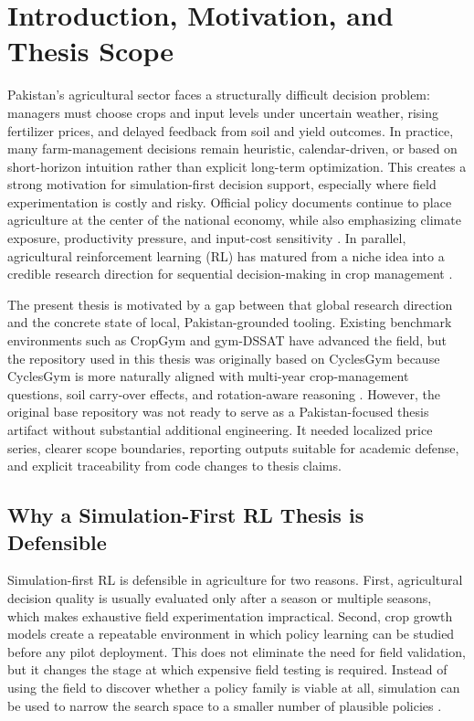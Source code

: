 \chapter{Introduction, Motivation, and Thesis Scope}

Pakistan's agricultural sector faces a structurally difficult decision problem: managers must choose crops and input levels under uncertain weather, rising fertilizer prices, and delayed feedback from soil and yield outcomes. In practice, many farm-management decisions remain heuristic, calendar-driven, or based on short-horizon intuition rather than explicit long-term optimization. This creates a strong motivation for simulation-first decision support, especially where field experimentation is costly and risky. Official policy documents continue to place agriculture at the center of the national economy, while also emphasizing climate exposure, productivity pressure, and input-cost sensitivity \citep{pakistaneconomicsurvey2025}. In parallel, agricultural reinforcement learning (RL) has matured from a niche idea into a credible research direction for sequential decision-making in crop management \citep{gautron2022review}.

The present thesis is motivated by a gap between that global research direction and the concrete state of local, Pakistan-grounded tooling. Existing benchmark environments such as CropGym and gym-DSSAT have advanced the field, but the repository used in this thesis was originally based on CyclesGym because CyclesGym is more naturally aligned with multi-year crop-management questions, soil carry-over effects, and rotation-aware reasoning \citep{kallenberg2023cropgym,gautron2022gymdssat,turchetta2022cyclesgym}. However, the original base repository was not ready to serve as a Pakistan-focused thesis artifact without substantial additional engineering. It needed localized price series, clearer scope boundaries, reporting outputs suitable for academic defense, and explicit traceability from code changes to thesis claims.

\section{Why a Simulation-First RL Thesis is Defensible}

Simulation-first RL is defensible in agriculture for two reasons. First, agricultural decision quality is usually evaluated only after a season or multiple seasons, which makes exhaustive field experimentation impractical. Second, crop growth models create a repeatable environment in which policy learning can be studied before any pilot deployment. This does not eliminate the need for field validation, but it changes the stage at which expensive field testing is required. Instead of using the field to discover whether a policy family is viable at all, simulation can be used to narrow the search space to a smaller number of plausible policies \citep{turchetta2022cyclesgym,gautron2022review}.

